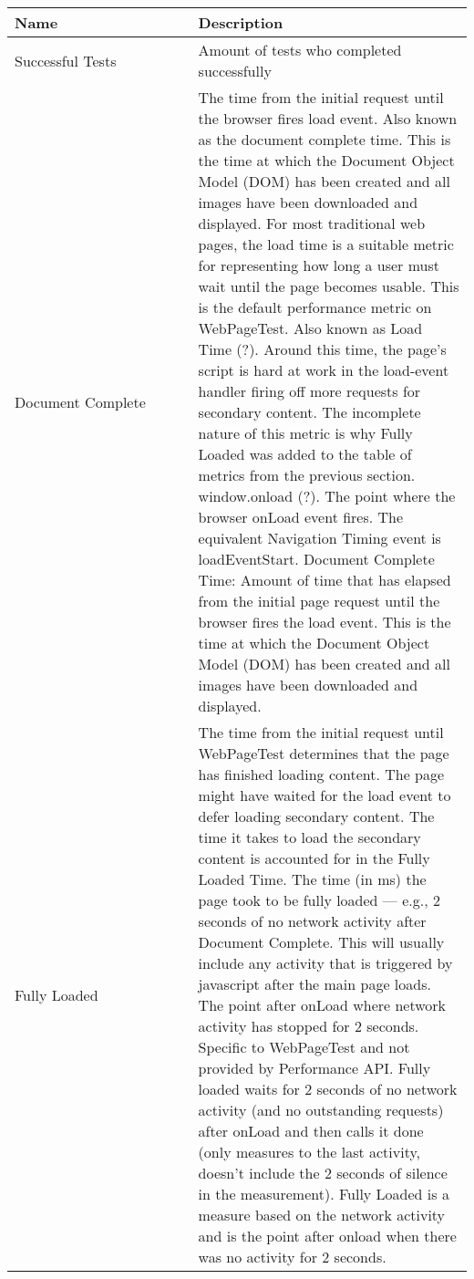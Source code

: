 \begin{center}
	\small
	\begin{longtable}{ p{0.4\linewidth} | p{0.6\linewidth} }
	Name & Description \\ 
	\hline
	Successful Tests & Amount of tests who completed successfully  \\
	
	Document Complete & The time from the initial request until the browser fires load event. Also known as the document complete time. This is the time at which the Document Object Model (DOM) has been created and all images have been downloaded and displayed. For most traditional web pages, the load time is a suitable metric for representing how long a user must wait until the page becomes usable. This is the default performance metric on WebPageTest. Also known as Load Time (?). Around this time, the page's script is hard at work in the load-event handler firing off more requests for secondary content. The incomplete nature of this metric is why Fully Loaded was added to the table of metrics from the previous section. window.onload (?). The point where the browser onLoad event fires. The equivalent Navigation Timing event is loadEventStart. Document Complete Time: Amount of time that has elapsed from the initial page request until the browser fires the load event. This is the time at which the Document Object Model (DOM) has been created and all images have been downloaded and displayed. \\
	
	Fully Loaded & The time from the initial request until WebPageTest determines that the page has finished loading content. The page might have waited for the load event to defer loading secondary content. The time it takes to load the secondary content is accounted for in the Fully Loaded Time. The time (in ms) the page took to be fully loaded — e.g., 2 seconds of no network activity after Document Complete. This will usually include any activity that is triggered by javascript after the main page loads. The point after onLoad where network activity has stopped for 2 seconds. Specific to WebPageTest and not provided by Performance API. Fully loaded waits for 2 seconds of no network activity (and no outstanding requests) after onLoad and then calls it done (only measures to the last activity, doesn't include the 2 seconds of silence in the measurement). Fully Loaded is a measure based on the network activity and is the point after onload when there was no activity for 2 seconds. \\
	

\end{longtable}
\end{center}
